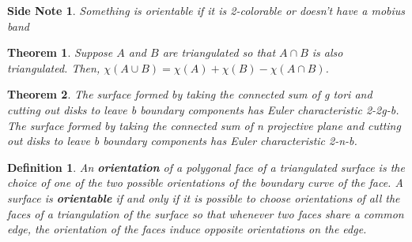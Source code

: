 \documentclass[executivepaper]{article}
\newtheorem{definition}{Definition}
\newtheorem{theorem}{Theorem}
\newtheorem{sidenote}{Side Note}
\begin{document}
\vspace{2mm}

\begin{tcolorbox}

\begin{sidenote}

\textit{Something is orientable if it is 2-colorable or doesn't have a mobius band}

\end{sidenote}

\end{tcolorbox}

\begin{tcolorbox}

\begin{theorem}

\textit{Suppose $A$ and $B$ are triangulated so that $A \cap B$ is also triangulated. Then, $\chi(A \cup B)=\chi(A)+\chi(B)-\chi(A \cap B)$}.

\end{theorem}

\end{tcolorbox}

\vspace{2mm}

\begin{tcolorbox}

\begin{theorem}

\textit{The surface formed by taking the connected sum of g tori and cutting out disks to leave b boundary components has Euler characteristic 2-2g-b. The surface formed by taking the connected sum of n projective plane and cutting out disks to leave b boundary components has Euler characteristic 2-n-b}.

\end{theorem}

\end{tcolorbox}

\vspace{2mm}

\begin{tcolorbox}

\begin{definition}

\textit{An \textbf{orientation} of a polygonal face of a triangulated surface is the choice of one of the two possible orientations of the boundary curve of the face. A surface is \textbf{orientable} if and only if it is possible to choose orientations of all the faces of a triangulation of the surface so that whenever two faces share a common edge, the orientation of the faces induce opposite orientations on the edge.}

\end{definition}

\end{tcolorbox}
\end{document}
